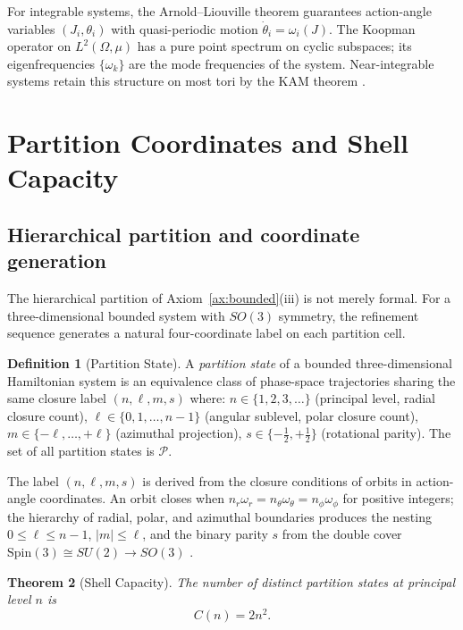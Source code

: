 \documentclass[twocolumn,10pt,a4paper]{article}
\theoremstyle{thmstyle}
\newtheorem{theorem}{Theorem}[section]
\theoremstyle{definition}
\newtheorem{definition}[theorem]{Definition}
\theoremstyle{remark}
\newcommand{\Parts}{\mathcal{P}}
\begin{document}
For integrable systems, the Arnold--Liouville theorem \citep{arnold1989}
guarantees action-angle variables $(J_i, \theta_i)$ with quasi-periodic
motion $\dot\theta_i = \omega_i(J)$. The Koopman operator \citep{koopman1931}
on $L^2(\Omega,\mu)$ has a pure point spectrum on cyclic subspaces; its
eigenfrequencies $\{\omega_k\}$ are the mode frequencies of the system.
Near-integrable systems retain this structure on most tori by the
KAM theorem \citep{kolmogorov1954,arnold1963,moser1962}.

\section{Partition Coordinates and Shell Capacity}
\label{sec:partition}

\subsection{Hierarchical partition and coordinate generation}

The hierarchical partition of Axiom~\ref{ax:bounded}(iii) is not merely
formal. For a three-dimensional bounded system with $SO(3)$ symmetry, the
refinement sequence generates a natural four-coordinate label on each
partition cell.

\begin{definition}[Partition State]
A \emph{partition state} of a bounded three-dimensional Hamiltonian system
is an equivalence class of phase-space trajectories sharing the same closure
label $(n, \ell, m, s)$ where:
$n \in \{1,2,3,\ldots\}$ (principal level, radial closure count),
$\ell \in \{0,1,\ldots,n-1\}$ (angular sublevel, polar closure count),
$m \in \{-\ell,\ldots,+\ell\}$ (azimuthal projection),
$s \in \{-\tfrac12, +\tfrac12\}$ (rotational parity).
The set of all partition states is $\Parts$.
\end{definition}

The label $(n,\ell,m,s)$ is derived from the closure conditions of orbits in
action-angle coordinates. An orbit closes when $n_r \omega_r = n_\theta
\omega_\theta = n_\phi \omega_\phi$ for positive integers; the hierarchy
of radial, polar, and azimuthal boundaries produces the nesting
$0 \leq \ell \leq n-1$, $|m| \leq \ell$, and the binary parity $s$
from the double cover $\mathrm{Spin}(3) \cong SU(2) \to SO(3)$
\citep{wigner1959}.

\begin{theorem}[Shell Capacity]
\label{thm:capacity}
The number of distinct partition states at principal level $n$ is
\begin{equation}
C(n) = 2n^2.
\label{eq:capacity}
\end{equation}
\end{theorem}
\end{document}
